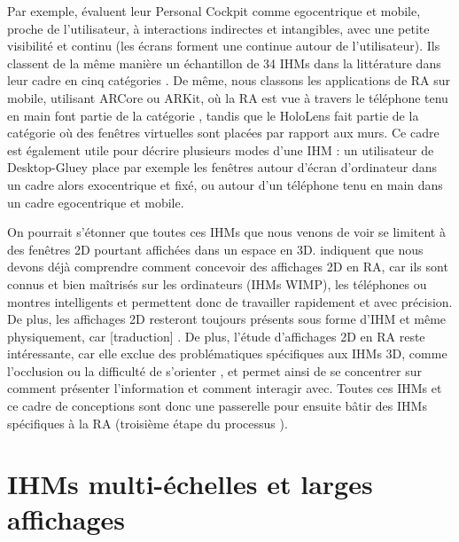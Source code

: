 Par exemple, \cite{Ens2014a} évaluent leur Personal Cockpit comme egocentrique et mobile, proche de l'utilisateur, à interactions indirectes et intangibles, avec une petite visibilité et continu (les écrans forment une  continue autour de l'utilisateur). Ils classent de la même manière un échantillon de 34 IHMs dans la littérature dans leur cadre en cinq catégories . De même, nous classons les applications de RA sur mobile, utilisant ARCore ou ARKit, où la RA est vue à travers le téléphone tenu en main font partie de la catégorie , tandis que le HoloLens fait partie de la catégorie  où des fenêtres virtuelles sont placées par rapport aux murs. Ce cadre est également utile pour décrire plusieurs modes d'une IHM : un utilisateur de Desktop-Gluey place par exemple les fenêtres autour d'écran d'ordinateur dans un cadre alors exocentrique et fixé, ou autour d'un téléphone tenu en main dans un cadre egocentrique et mobile.


On pourrait s'étonner que toutes ces IHMs que nous venons de voir se limitent à des fenêtres 2D pourtant affichées dans un espace en 3D. \cite{Ens2014a} indiquent que nous devons déjà comprendre comment concevoir des affichages 2D en RA, car ils sont connus et bien maîtrisés sur les ordinateurs (IHMs WIMP), les téléphones ou montres intelligents et permettent donc de travailler rapidement et avec précision. De plus, les affichages 2D resteront toujours présents sous forme d'IHM et même physiquement, car [traduction]  \citep[p. 1]{Ens2014a}. De plus, l'étude d'affichages 2D en RA reste intéressante, car elle exclue des problématiques spécifiques aux IHMs 3D, comme l'occlusion ou la difficulté de s'orienter \citep{Berge2014}, et permet ainsi de se concentrer sur comment présenter l'information et comment interagir avec. Toutes ces IHMs et ce cadre de conceptions sont donc une passerelle pour ensuite bâtir des IHMs spécifiques à la RA (troisième étape du processus \cite{Billinghurst2005}).


\section{IHMs multi-échelles et larges affichages}
\label{sec:litterature_multiscale_displays}

